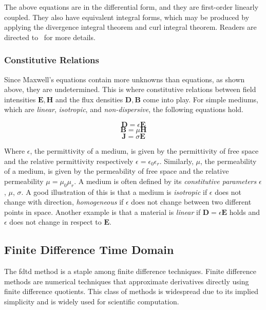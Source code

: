 The above equations are in the differential form, and they are first-order linearly coupled. They also have equivalent integral forms, which may be produced by applying the divergence integral theorem and curl integral theorem. Readers are directed to~\cite[Chapter~2.4]{staelin2009electromagnetics} for more details. 




\subsubsection*{Constitutive Relations}
Since Maxwell's equations contain more unknowns than equations, as shown above, they are undetermined. This is where constitutive relations between field intensities $\mathbf{E},\mathbf{H}$ and the flux densities $\mathbf{D},\mathbf{B}$ come into play. 
For simple mediums, which are \emph{linear}, \emph{isotropic}, and \emph{non-dispersive}, the following equations hold.


\begin{equation}
\mathbf{D} = \epsilon \mathbf{E}
\end{equation}
\begin{equation}
\mathbf{B} = \mu \mathbf{H}
\end{equation}
\begin{equation}
\mathbf{J} = \sigma \mathbf{E}
\end{equation}

Where $\epsilon$, the permittivity of a medium, is given by the permittivity of free space and the relative permittivity respectively $\epsilon = \epsilon_0\epsilon_r$. Similarly, $\mu$, the permeability of a medium, is given by the permeability of free space and the relative permeability $\mu = \mu_0\mu_r$. A medium is often defined by its \emph{constitutive parameters} $\epsilon$, $\mu$, $\sigma$. A good illustration of this is that a medium is \emph{isotropic} if $\epsilon$ does not change with direction, \emph{homogeneous} if $\epsilon$ does not change between two different points in space. Another example is that a material is \emph{linear} if $\mathbf{D} = \epsilon \mathbf{E}$ holds and $\epsilon$ does not change in respect to $\mathbf{E}$.





\subsection*{Finite Difference Time Domain}
The \gls{fdtd} method is a staple among finite difference techniques. Finite difference methods are numerical techniques that approximate derivatives directly using finite difference quotients. This class of methods is widespread due to its implied simplicity and is widely used for scientific computation. 


